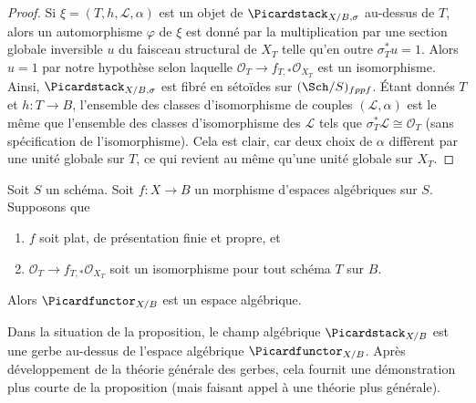 \begin{proof}
Si $\xi = (T, h, \mathcal{L}, \alpha)$ est un objet de
$\Picardstack_{X/B, \sigma}$ au-dessus de $T$, alors un automorphisme
$\varphi$ de $\xi$ est donné par la multiplication par une section globale
inversible $u$ du faisceau structural de $X_T$ telle qu'en outre
$\sigma_T^*u = 1$. Alors $u = 1$ par notre hypothèse selon laquelle
$\mathcal{O}_T \to f_{T, *}\mathcal{O}_{X_T}$ est un isomorphisme.
Ainsi, $\Picardstack_{X/B, \sigma}$ est fibré en sétoïdes sur
$(\Sch/S)_{fppf}$. Étant donnés $T$ et $h : T \to B$, l'ensemble des classes
d'isomorphisme de couples $(\mathcal{L}, \alpha)$ est le même que l'ensemble
des classes d'isomorphisme des $\mathcal{L}$ tels que
$\sigma_T^*\mathcal{L} \cong \mathcal{O}_T$ (sans spécification de
l'isomorphisme). Cela est clair, car deux choix de $\alpha$ diffèrent par une
unité globale sur $T$, ce qui revient au même qu'une unité globale sur $X_T$.
\end{proof}

\begin{proposition}
\label{proposition-pic-functor}
Soit $S$ un schéma. Soit $f : X \to B$ un morphisme d'espaces algébriques
sur $S$. Supposons que
\begin{enumerate}
\item $f$ soit plat, de présentation finie et propre, et
\item $\mathcal{O}_T \to f_{T, *}\mathcal{O}_{X_T}$ soit un isomorphisme
pour tout schéma $T$ sur $B$.
\end{enumerate}
Alors $\Picardfunctor_{X/B}$ est un espace algébrique.
\end{proposition}

\noindent
Dans la situation de la proposition, le champ algébrique
$\Picardstack_{X/B}$ est une gerbe au-dessus de l'espace algébrique
$\Picardfunctor_{X/B}$. Après développement de la théorie générale des gerbes,
cela fournit une démonstration plus courte de la proposition (mais faisant
appel à une théorie plus générale).


